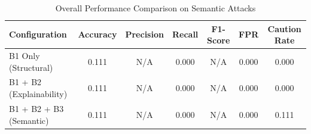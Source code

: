 \begin{table}[h]
\centering
\caption{Overall Performance Comparison on Semantic Attacks}
\label{tab:semantic_results}
\begin{tabular}{lcccccc}
\hline
\textbf{Configuration} & \textbf{Accuracy} & \textbf{Precision} & \textbf{Recall} & \textbf{F1-Score} & \textbf{FPR} & \textbf{Caution Rate} \\ \hline
B1 Only (Structural) & 0.111 & N/A & 0.000 & N/A & 0.000 & 0.000 \\
B1 + B2 (Explainability) & 0.111 & N/A & 0.000 & N/A & 0.000 & 0.000 \\
B1 + B2 + B3 (Semantic) & 0.111 & N/A & 0.000 & N/A & 0.000 & 0.111 \\
\hline
\end{tabular}
\end{table}
